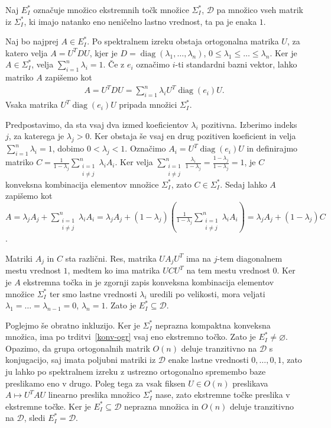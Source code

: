 \documentclass[mat2, tisk]{fmfdelo}
\begin{document}
\begin{dokaz}
Naj $E_I^*$ označuje množico ekstremnih točk množice $\Sigma_I^*$,
$\mathcal{D}$ pa množico vseh matrik iz $\Sigma_I^*$, ki imajo natanko
eno neničelno lastno vrednost, ta pa je enaka $1$.

Naj bo najprej $A\in E_I^*$. Po spektralnem izreku obstaja ortogonalna
matrika $U$, za katero velja $A=U^T D U$,
kjer je $D=\operatorname{diag}(\lambda_1,\ldots,\lambda_n)$,
$0\leq\lambda_1\leq\ldots\leq\lambda_n$.
Ker je $A\in\Sigma_I^*$, velja $\sum\limits_{i=1}^n\lambda_i=1$.
Če z $e_i$ označimo $i$-ti standardni bazni vektor, lahko matriko $A$ zapišemo kot
\begin{align*}
A
=
U^T D U
=
\sum\limits_{i=1}^n
\lambda_i
U^T\operatorname{diag}(e_i)U.
\end{align*}
Vsaka matrika $U^T\operatorname{diag}(e_i)U$
pripada množici $\Sigma_I^*$. 

Predpostavimo, da sta vsaj dva izmed koeficientov $\lambda_i$
pozitivna. Izberimo indeks $j$, za katerega je $\lambda_j>0$.
Ker obstaja še vsaj en drug pozitiven koeficient in velja
$\sum\limits_{i=1}^n\lambda_i=1$, dobimo $0<\lambda_j<1$.
Označimo $A_i=U^T\operatorname{diag}(e_i)U$
in definirajmo matriko $C=\frac{1}{1-\lambda_j}
\sum\limits_{\substack{i=1\\ i\neq j}}^n
\lambda_i A_i$.
Ker velja
$\sum\limits_{\substack{i=1\\ i\neq j}}^n
\frac{\lambda_i}{1-\lambda_j}
=\frac{1-\lambda_j}{1-\lambda_j}=1$,
je $C$ konveksna kombinacija elementov množice $\Sigma_I^*$, zato
$C\in\Sigma_I^*$.
Sedaj lahko $A$ zapišemo kot
$A=\lambda_j A_j
+
\sum\limits_{\substack{i=1\\ i\neq j}}^n
\lambda_i A_i
=
\lambda_j A_j
+
(1-\lambda_j)
\left(
\frac{1}{1-\lambda_j}
\sum\limits_{\substack{i=1\\ i\neq j}}^n
\lambda_i A_i
\right)
=
\lambda_j A_j+(1-\lambda_j)C$.

Matriki $A_j$ in $C$ sta različni.
Res, matrika $UA_jU^T$ ima na $j$-tem
diagonalnem mestu vrednost $1$,
medtem ko ima matrika $UCU^T$
na tem mestu vrednost $0$. Ker je $A$ ekstremna točka in je zgornji
zapis konveksna kombinacija elementov množice $\Sigma_I^*$ ter smo lastne vrednosti $\lambda_i$ 
uredili po velikosti, mora veljati
$\lambda_1=\ldots=\lambda_{n-1}=0$,
$\lambda_n=1$.
Zato je
$E_I^*\subseteq\mathcal{D}$.

Poglejmo še obratno inkluzijo. Ker je $\Sigma_I^*$ neprazna kompaktna
konveksna množica, ima po trditvi~\ref{konv-ogr} vsaj eno ekstremno točko.
Zato je $E_I^*\neq\varnothing$. Opazimo, da grupa ortogonalnih matrik $O(n)$
deluje tranzitivno na $\mathcal{D}$ s konjugacijo, saj imata poljubni matriki iz $\mathcal D$ enake lastne 
vrednosti $0,\ldots,0,1$, zato ju lahko po spektralnem izreku z ustrezno ortogonalno spremembo baze 
preslikamo eno v drugo. Poleg tega za vsak fiksen $U\in O(n)$ preslikava
$A
\longmapsto
U^T A U$
linearno preslika množico $\Sigma_I^*$ nase, zato ekstremne točke
preslika v ekstremne točke. Ker je $E_I^*\subseteq\mathcal{D}$
neprazna množica in $O(n)$ deluje tranzitivno na $\mathcal{D}$, sledi
$E_I^*
=
\mathcal{D}$.
\end{dokaz}
\end{document}

